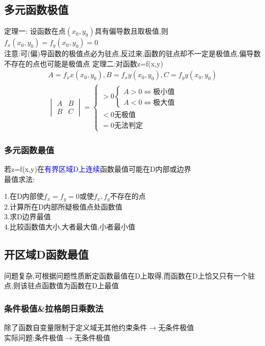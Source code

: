 \documentclass[10pt, a4paper, oneside]{ctexart}
\begin{document}
\begin{sloppypar}
	\subsection{多元函数极值}
	定理一:
	设函数在点$(x_0,y_0)$具有偏导数且取极值,则$f_x(x_0,y_0)=f_y(x_0,y_0)=0$\\
	注意:可(偏)导函数的极值点必为驻点,反过来,函数的驻点却不一定是极值点,偏导数不存在的点也可能是极值点
	定理二:对函数z=f(x,y)
	\begin{gather*}
		A=f_xx(x_0,y_0), B=f_xy(x_0,y_0), C=f_yy(x_0,y_0)\\
		\begin{vmatrix}
			A & B \\
			B & C
		\end{vmatrix}=\begin{cases}
			>0\begin{cases}
				  A>0 \Leftrightarrow\text{极小值} \\
				  A<0 \Leftrightarrow\text{极大值}
			  \end{cases} \\
			<0\text{无极值}                    \\
			=0\text{无法判定}
		\end{cases}
	\end{gather*}

	\subsubsection{多元函数最值}
	若z=f(x,y)在\textcolor{blue}{有界区域D上连续}函数最值可能在D内部或边界\\
	最值求法:
	\begin{center}
		1.在D内部使$f_x=f_y=0$或使$f_x,f_y$不存在的点\\
		2.计算所在D内部所疑极值点处函数值\\
		3.求D边界最值\\
		4.比较函数值大小,大者最大值,小者最小值
	\end{center}
	\subsection{开区域D函数最值}
	问题复杂,可根据问题性质断定函数最值在D上取得,而函数在D上恰又只有一个驻点,则该驻点函数值为函数在D上最值
	\subsubsection{条件极值\&拉格朗日乘数法}
	除了函数自变量限制于定义域无其他约束条件$\rightarrow$无条件极值\\
	实际问题:条件极值$\to$无条件极值


\end{sloppypar}
\end{document}

